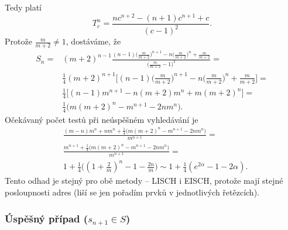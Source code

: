 \documentclass[a4paper,12pt]{article}
\begin{document}
Tedy platí 
$$T_c^n=\frac {nc^{n+2}-(n+1)c^{n+1}+c}{(c-1)^2}.$$
Protože $\frac m{m+2}\ne 1$, dostáváme, že 
\begin{align*} S_n=&(m+2)^{n-1}\frac {(n-1)\big(\frac m{m+2}\big)^{n+1}
-n\big(\frac m{m+2}\big)^n+\frac m{m+2}}{\big(\frac m{m+2}-1\big)^
2}=\\
&\frac 14(m+2)^{n+1}\big[(n-1)\big(\frac m{m+2}\big)^{n+1}-n\big(\frac 
m{m+2}\big)^n+\frac m{m+2}\big]=\\
&\frac 14\big[(n-1)m^{n+1}-n(m+2)m^n+m(m+2)^n\big]=\\
&\frac 14\big(m(m+2)^n-m^{n+1}-2nm^n\big).\end{align*}
Očekávaný počet testů při neúspěšném 
vyhledávání je  
\begin{align*}&\frac {(m-n)m^n+nm^n+\frac 14\big(m(m+2)^n-m^{n+1}-2nm^n\big
)}{m^{n+1}}=\\
&\frac {m^{n+1}+\frac 14\big(m(m+2)^n-m^{n+1}-2nm^n\big)}{m^{n+1}}
=\\
&1+\frac 14\big((1+\frac 2m)^n-1-\frac {2n}m\big)\sim 1+\frac 14(
e^{2\alpha}-1-2\alpha ).\end{align*}
Tento odhad je stejný pro obě metody -- LISCH i EISCH, 
protože mají stejné posloupnosti adres (liší se jen pořadím 
prvků v jednotlivých řetězcích).

\subsubsection{Úspěšný případ ($s_{n+1}\in S$)}
\end{document}
